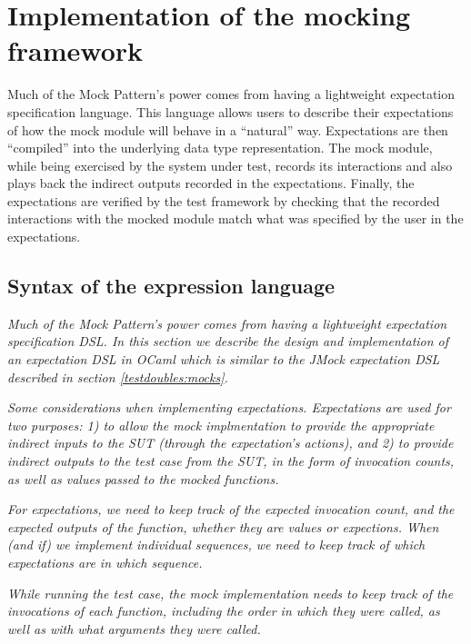 \section{Implementation of the mocking framework}
\label{application:implementation}


Much of the Mock Pattern's power comes from having a lightweight
expectation specification language. This language allows users to
describe their expectations of how the mock module will behave in a
``natural'' way. Expectations are then ``compiled'' into the
underlying data type representation. The mock module, while being
exercised by the system under test, records its interactions and also
plays back the indirect outputs recorded in the expectations. Finally,
the expectations are verified by the test framework by checking that
the recorded interactions with the mocked module match what was
specified by the user in the expectations.

\subsection{Syntax of the expression language}
\label{application:syntax}

\textit{Much of the Mock Pattern's power comes from having a
  lightweight expectation specification DSL. In this section we
  describe the design and implementation of an expectation DSL in
  OCaml which is similar to the JMock expectation DSL described in
  section \ref{testdoubles:mocks}.}

\textit{Some considerations when implementing
  expectations. Expectations are used for two purposes: 1) to allow
  the mock implmentation to provide the appropriate indirect inputs to
  the SUT (through the expectation's actions), and 2) to provide
  indirect outputs to the test case from the SUT, in the form of
  invocation counts, as well as values passed to the mocked
  functions.}

\textit{For expectations, we need to keep track of the expected
  invocation count, and the expected outputs of the function, whether
  they are values or expections. When (and if) we implement individual
  sequences, we need to keep track of which expectations are in which
  sequence.}

\textit{While running the test case, the mock implementation needs to
  keep track of the invocations of each function, including the order
  in which they were called, as well as with what arguments they were
  called.}

